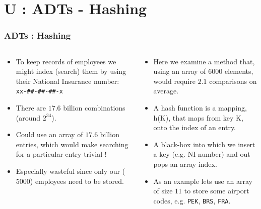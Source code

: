 \section{U : ADTs - Hashing}
\label{chap:adts_hashing}


\begin{frame}[fragile]
\frametitle{ADTs : Hashing}
\begin{columns}[T]

\begin{column}{0.45\textwidth}
\begin{itemize}[<+->]
\item To keep records of employees we might index (search) them by using
their National Insurance number: \verb^xx-##-##-##-x^
\item There are $17.6$ billion combinations (around $2^{34}$).
\item Could use an array of $17.6$ billion entries, which would make searching
for a particular entry trivial !
\item Especially wasteful since only our ($5000$) employees need to be
stored.
\end{itemize}
\end{column}

\pause
\begin{column}{0.45\textwidth}
\begin{itemize}[<+->]
\item Here we examine a method that, using an array of $6000$
elements, would require $2.1$ comparisons on average.
\item A hash function is a mapping, h(K), that maps from key K, onto the index of an entry.
\item A black-box into which we insert a key (e.g. NI number) and out pops an array index.
\item As an example lets use an array of size $11$ to store some airport codes, e.g.
\verb^PEK^, \verb^BRS^, \verb^FRA^.
\end{itemize}
\end{column}

\end{columns}
\end{frame}


